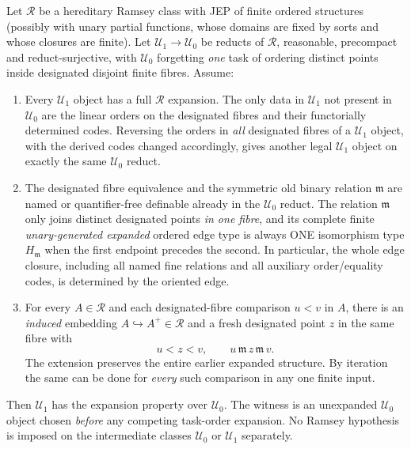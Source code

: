 \begin{theorem}
\label{thm:abstract-reset-order-EP}
Let $\mathcal R$ be a hereditary Ramsey class with JEP of finite
ordered structures (possibly with unary partial functions, whose
domains are fixed by sorts and whose closures are finite).
Let $\mathcal U_1\to\mathcal U_0$ be reducts of $\mathcal R$,
reasonable, precompact and reduct-surjective, with
$\mathcal U_0$ forgetting \emph{one} task of ordering distinct
points inside designated disjoint finite fibres. Assume:

\begin{enumerate}[label=(\roman*),leftmargin=*]
\item Every $\mathcal U_1$ object has a full $\mathcal R$
expansion. The only data in $\mathcal U_1$ not present in
$\mathcal U_0$ are the linear orders on the designated fibres
and their functorially determined codes. Reversing the orders
in \emph{all} designated fibres of a $\mathcal U_1$ object,
with the derived codes changed accordingly, gives another
legal $\mathcal U_1$ object on exactly the same
$\mathcal U_0$ reduct.
\item The designated fibre equivalence and the symmetric
old binary relation $\mathfrak m$ are named or
quantifier-free definable already in the
$\mathcal U_0$ reduct. The relation $\mathfrak m$
only joins distinct designated points \emph{in one fibre},
and its complete finite \emph{unary-generated expanded}
ordered edge type is always ONE isomorphism type
$H_{\mathfrak m}$ when the first endpoint precedes
the second. In particular, the whole edge closure,
including all named fine relations and all auxiliary
order/equality codes, is determined by the oriented edge.
\item For every $A\in\mathcal R$ and each designated-fibre
comparison $u<v$ in $A$, there is an \emph{induced}
embedding $A\hookrightarrow A^+\in\mathcal R$ and
a fresh designated point $z$ in the same fibre with
\[
       u<z<v,\qquad
       u\,\mathfrak m\,z\,\mathfrak m\,v.
\]
The extension preserves the entire earlier expanded
structure. By iteration the same can be done for
\emph{every} such comparison in any one finite input.
\end{enumerate}

Then $\mathcal U_1$ has the expansion property over
$\mathcal U_0$. The witness is an unexpanded
$\mathcal U_0$ object chosen \emph{before} any competing
task-order expansion. No Ramsey hypothesis is imposed
on the intermediate classes $\mathcal U_0$ or
$\mathcal U_1$ separately.
\end{theorem}

